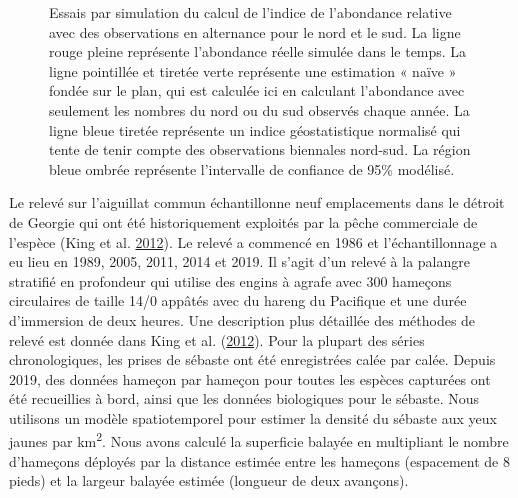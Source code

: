 \documentclass[11pt]{book}
\begin{document}
\clearpage
\begin{figure}[htb]

{\centering {} 

}

\caption{Essais par simulation du calcul de l’indice de l’abondance relative avec des observations en alternance pour le nord et le sud. La ligne rouge pleine représente l’abondance réelle simulée dans le temps. La ligne pointillée et tiretée verte représente une estimation « naïve » fondée sur le plan, qui est calculée ici en calculant l’abondance avec seulement les nombres du nord ou du sud observés chaque année. La ligne bleue tiretée représente un indice géostatistique normalisé qui tente de tenir compte des observations biennales nord-sud. La région bleue ombrée représente l’intervalle de confiance de 95\% modélisé.}\label{fig:stich-sim-index}
\end{figure}
\clearpage

\hypertarget{sec:dogfish-index-data}{%
\label{sec:dogfish-index-data}}

Le relevé sur l'aiguillat commun échantillonne neuf emplacements dans le détroit de Georgie qui ont été historiquement exploités par la pêche commerciale de l'espèce (King et al. \protect\hyperlink{ref-king2012}{2012}). Le relevé a commencé en 1986 et l'échantillonnage a eu lieu en 1989, 2005, 2011, 2014 et 2019. Il s'agit d'un relevé à la palangre stratifié en profondeur qui utilise des engins à agrafe avec 300 hameçons circulaires de taille 14/0 appâtés avec du hareng du Pacifique et une durée d'immersion de deux heures. Une description plus détaillée des méthodes de relevé est donnée dans King et al. (\protect\hyperlink{ref-king2012}{2012}). Pour la plupart des séries chronologiques, les prises de sébaste ont été enregistrées calée par calée. Depuis 2019, des données hameçon par hameçon pour toutes les espèces capturées ont été recueillies à bord, ainsi que les données biologiques pour le sébaste. Nous utilisons un modèle spatiotemporel pour estimer la densité du sébaste aux yeux jaunes par km\textsuperscript{2}. Nous avons calculé la superficie balayée en multipliant le nombre d'hameçons déployés par la distance estimée entre les hameçons (espacement de 8 pieds) et la largeur balayée estimée (longueur de deux avançons).
\end{document}
